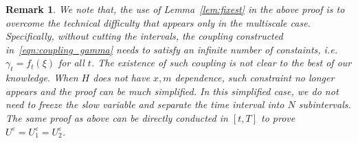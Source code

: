 \documentclass[reqno,11pt]{amsart}
\newtheorem{remark}[theorem]{Remark}
\numberwithin{equation}{section}
\newcommand{\R}{\mathbb{R}} %
\newcommand{\e}{\varepsilon}
\newcommand{\ep}{\varepsilon}
\begin{document}
\begin{remark} We note that, the use of Lemma~\ref{lem:fixest} in the above proof is to overcome the technical difficulty that appears only in the multiscale case. Specifically, without cutting the intervals, the coupling constructed in~\eqref{eqn:coupling_gamma} needs to satisfy an infinite number of constaints, i.e. $\gamma_t=f_t(\xi)$ for all $t$. The existence of such coupling is not clear to the best of our knowledge. When $H$ does not have $x,m$ dependence, such constraint no longer appears and the proof can be much simplified. In this simplified case, we do not need to freeze the slow variable and separate the time interval into $N$ subintervals. The same proof as above can be directly conducted in $[t,T]$ to prove $U^\e=U^\e_1=U^\e_2$.
\end{remark}



\end{document}
